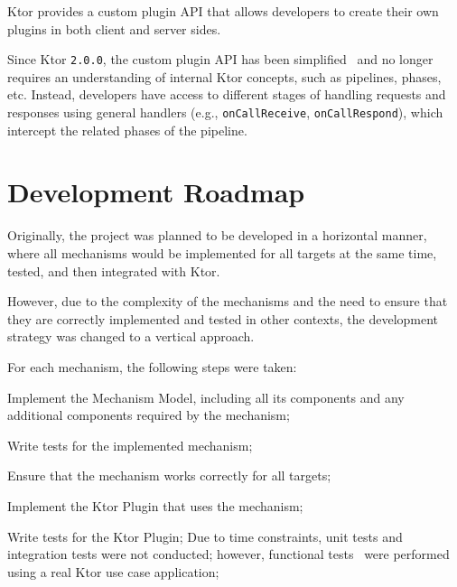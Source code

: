Ktor provides a custom plugin API that allows developers to create their own plugins in both client and server sides.

Since Ktor \texttt{2.0.0}, the custom plugin API has been simplified~\cite{ktor-server-custom-plugins, ktor-client-custom-plugins} and no longer requires an understanding of internal Ktor concepts, such as pipelines, phases, etc.
Instead, developers have access to different stages of handling requests and responses using general handlers (e.g., \texttt{onCallReceive}, \texttt{onCallRespond}), which intercept the related phases of the pipeline.


\section{Development Roadmap}\label{sec:development-roadmap}

Originally, the project was planned to be developed in a horizontal manner, where all mechanisms would be implemented for all targets at the same time, tested, and then integrated with Ktor.

However, due to the complexity of the mechanisms and the need to ensure that they are correctly implemented and tested
in other contexts, the development strategy was changed to a vertical approach.

For each mechanism, the following steps were taken:
\begin{boldenumerate}
    \item Implement the Mechanism Model, including all its components and any additional components required by the mechanism;
    \item Write tests for the implemented mechanism;
    \item Ensure that the mechanism works correctly for all targets;
    \item Implement the Ktor Plugin that uses the mechanism;
    \item Write tests for the Ktor Plugin;
    Due to time constraints, unit tests and integration tests were not conducted; however, functional tests~\cite{software-test-types} were performed using a real Ktor use case application;
\end{boldenumerate}
